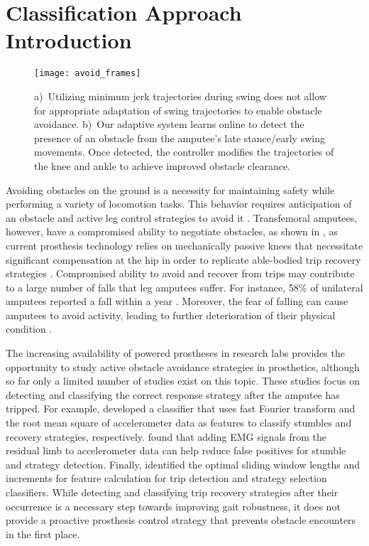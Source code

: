 \section{Classification Approach Introduction}\label{sec:swing_control_class}

\begin{figure*}[t]
\centering
\texttt{[image: avoid\_frames]}
\caption[Comparison of minimum jerk and adaptive swing controls when stepping
over obstacle]{a)~Utilizing minimum jerk trajectories during swing does not
allow for appropriate adaptation of swing trajectories to enable obstacle
avoidance. b)~Our adaptive system learns online to detect the presence of an
obstacle from the amputee's late stance/early swing movements. Once detected,
the controller modifies the trajectories of the knee and ankle to achieve
improved obstacle clearance.}\label{fig:avoid_frames}
\end{figure*}

Avoiding obstacles on the ground is a necessity for maintaining safety while
performing a variety of locomotion tasks. This behavior requires anticipation of
an obstacle and active leg control strategies to avoid it \citep{patla1995role}.
Transfemoral amputees, however, have a compromised ability to negotiate
obstacles, as shown in , as current prosthesis technology
relies on mechanically passive knees that necessitate significant compensation
at the hip in order to replicate able-bodied trip recovery strategies
\citep{shirota2015transfemoral}. Compromised ability to avoid and recover from
trips may contribute to a large number of falls that leg amputees suffer. For
instance, 58\% of unilateral amputees reported a fall within a year
\citep{kulkarni1996falls}. Moreover, the fear of falling can cause amputees to
avoid activity, leading to further deterioration of their physical condition
\citep{miller2001prevalence}.

The increasing availability of powered prostheses in research labs provides the
opportunity to study active obstacle avoidance strategies in prosthetics,
although so far only a limited number of studies exist on this topic. These
studies focus on detecting and classifying the correct response strategy after
the amputee has tripped. For example, \citet{lawson2010stumble} developed a
classifier that uses fast Fourier transform and the root mean square of
accelerometer data as features to classify stumbles and recovery strategies,
respectively. \citet{zhang2011towards} found that adding EMG signals from the
residual limb to accelerometer data can help reduce false positives for stumble
and strategy detection. Finally, \citet{shirota2014recovery} identified the
optimal sliding window lengths and increments for feature calculation for trip
detection and strategy selection classifiers. While detecting and classifying
trip recovery strategies after their occurrence is a necessary step towards
improving gait robustness, it does not provide a proactive prosthesis control
strategy that prevents obstacle encounters in the first place.

